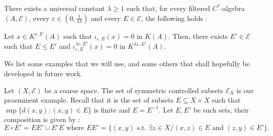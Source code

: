 \begin{rk}\label{approximation}
There exists a universal constant $\lambda \geq 1$ such that, for every filtered $C^*$-algebra $(A,\mathcal E)$, every $\varepsilon\in (0,\frac{1}{4\lambda})$ and every $E\in \mathcal E$, the following holds :

Let $x\in K^{\varepsilon,E}(A)$ such that $ \iota_{\varepsilon,E}(x) = 0 $ in $K(A)$. Then, there exists $E'\in\mathcal E$ such that $E\leq E'$ and $\iota_{\varepsilon,E}^{\lambda\varepsilon,E'}(x)=0$ in $K^{\lambda\varepsilon,E'}(A)$.
\end{rk}



We list some examples that we will use, and some others that shall hopefully be developed in future work.

\begin{Expl}
Let $(X,\mathcal E)$ be a coarse space. The set of symmetric controlled subsets $\mathcal E_X$ is our proeminent example. Recall that it is the set of subsets $E\subseteq X\times X$ such that $\sup \{ d(x,y) : (x,y)\in E\}$ is finite and $E=E^{-1}$. Let $E,E'$ be such sets, their composition is given by :
\[E\circ E' = EE' \cup E'E \text{ where }EE' = \{(x,y) \text{ s.t. }\exists z\in X / (x,z)\in E \text{ and }(z,y)\in E'\}.\]
\end{Expl}

